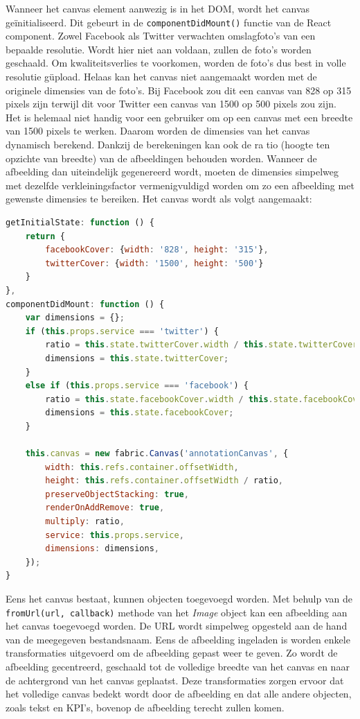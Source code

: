 Wanneer het canvas element aanwezig is in het DOM, wordt het canvas ge\"{i}nitialiseerd. Dit gebeurt in de \texttt{componentDidMount()} functie van de React component. Zowel Facebook als Twitter verwachten omslagfoto's van een bepaalde resolutie. Wordt hier niet aan voldaan, zullen de foto's worden geschaald. Om kwaliteitsverlies te voorkomen, worden de foto's dus best in volle resolutie g\"{u}pload. Helaas kan het canvas niet aangemaakt worden met de originele dimensies van de foto's. Bij Facebook zou dit een canvas van 828 op 315 pixels zijn terwijl dit voor Twitter een canvas van 1500 op 500 pixels zou zijn. Het is helemaal niet handig voor een gebruiker om op een canvas met een breedte van 1500 pixels te werken. Daarom worden de dimensies van het canvas dynamisch berekend. Dankzij de berekeningen kan ook de ra
tio (hoogte ten opzichte van breedte) van de afbeeldingen behouden worden. Wanneer de afbeelding dan uiteindelijk gegenereerd wordt, moeten de dimensies simpelweg met dezelfde verkleiningsfactor vermenigvuldigd worden om zo een afbeelding met gewenste dimensies te bereiken. Het canvas wordt als volgt aangemaakt:

\begin{lstlisting}[language=javascript]
getInitialState: function () {
	return {
		facebookCover: {width: '828', height: '315'},
		twitterCover: {width: '1500', height: '500'}
	}
},
componentDidMount: function () {
	var dimensions = {};
	if (this.props.service === 'twitter') {
		ratio = this.state.twitterCover.width / this.state.twitterCover.height;
		dimensions = this.state.twitterCover;
	}
	else if (this.props.service === 'facebook') {
		ratio = this.state.facebookCover.width / this.state.facebookCover.height;
		dimensions = this.state.facebookCover;
	}
		
	this.canvas = new fabric.Canvas('annotationCanvas', {
		width: this.refs.container.offsetWidth,
		height: this.refs.container.offsetWidth / ratio,
		preserveObjectStacking: true,
		renderOnAddRemove: true,
		multiply: ratio,
		service: this.props.service,
		dimensions: dimensions,
	});
}
\end{lstlisting}

Eens het canvas bestaat, kunnen objecten toegevoegd worden. Met behulp van de \texttt{fromUrl(url, callback)} methode van het \textit{Image} object kan een afbeelding aan het canvas toegevoegd worden. De URL wordt simpelweg opgesteld aan de hand van de meegegeven bestandsnaam. Eens de afbeelding ingeladen is worden enkele transformaties uitgevoerd om de afbeelding gepast weer te geven. Zo wordt de afbeelding gecentreerd, geschaald tot de volledige breedte van het canvas en naar de achtergrond van het canvas geplaatst. Deze transformaties zorgen ervoor dat het volledige canvas bedekt wordt door de afbeelding en dat alle andere objecten, zoals tekst en KPI's, bovenop de afbeelding terecht zullen komen. 


